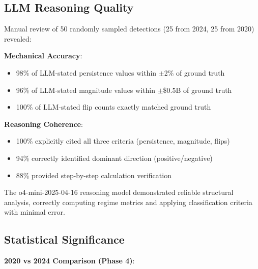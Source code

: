 \subsection{LLM Reasoning Quality}
\label{sec:reasoning_quality}

\vspace{0.2cm}

Manual review of 50 randomly sampled detections (25 from 2024, 25 from 2020) revealed:

\vspace{0.2cm}

\noindent\textbf{Mechanical Accuracy}:
\begin{itemize}
\item 98\% of LLM-stated persistence values within $\pm$2\% of ground truth
\item 96\% of LLM-stated magnitude values within $\pm$\$0.5B of ground truth
\item 100\% of LLM-stated flip counts exactly matched ground truth
\end{itemize}

\vspace{0.2cm}

\noindent\textbf{Reasoning Coherence}:
\begin{itemize}
\item 100\% explicitly cited all three criteria (persistence, magnitude, flips)
\item 94\% correctly identified dominant direction (positive/negative)
\item 88\% provided step-by-step calculation verification
\end{itemize}

\vspace{0.2cm}

The o4-mini-2025-04-16 reasoning model demonstrated reliable structural analysis, correctly computing regime metrics and applying classification criteria with minimal error.

\subsection{Statistical Significance}
\label{sec:statistical_significance}

\vspace{0.2cm}

\noindent\textbf{2020 vs 2024 Comparison (Phase 4)}:

\vspace{0.1cm}

